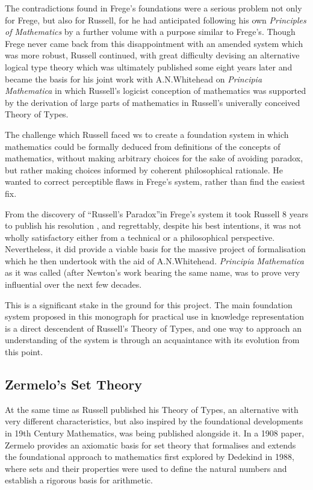 The contradictions found in Frege's foundations were a serious problem not only for Frege, but also for Russell, for he had anticipated following his own \emph{Principles of Mathematics}\cite{russell1903} by a further volume with a purpose similar to Frege's.
Though Frege never came back from this disappointment with an amended system which was more robust, Russell continued, with great difficulty devising an alternative logical type theory which was ultimately published some eight years later \cite{russell1908} and became the basis for his joint work with A.N.Whitehead on \emph{Principia Mathematica}\cite{whitehead1910} in which Russell's logicist conception of mathematics was supported by the derivation of large parts of mathematics in Russell's univerally conceived Theory of Types.

The challenge which Russell faced ws to create a foundation system in which mathematics could be formally deduced from definitions of the concepts of mathematics, without making arbitrary choices for the sake of avoiding paradox, but rather making choices informed by coherent philosophical rationale.
He wanted to correct perceptible flaws in Frege's system, rather than find the easiest fix.

From the discovery of ``Russell's Paradox''in Frege's system it took Russell 8 years to publish his resolution \cite{russell1908}, and regrettably, despite his best intentions, it was not wholly satisfactory either from a technical or a philosophical perspective.
Nevertheless, it did provide a viable basis for the massive project of formalisation which he then undertook with the aid of A.N.Whitehead.
\emph{Principia Mathematica} \cite{whitehead1910} as it was called (after Newton's work bearing the same name, was to prove very influential over the next few decades.

This is a significant stake in the ground for this project.
The main foundation system proposed in this monograph for practical use in knowledge representation is a direct descendent of Russell's Theory of Types, and one way to approach an understanding of the system is through an acquaintance with its evolution from this point.

\subsection{Zermelo's Set Theory}

At the same time as Russell published his Theory of Types, an alternative with very different characteristics, but also inspired by the foundational developments in 19th Century Mathematics, was being published alongside it.
In a 1908 paper, Zermelo\cite{zermelo1908} provides an axiomatic basis for set theory that formalises and extends the foundational approach to mathematics first explored by Dedekind in 1988\cite{dedekind1888}, where sets and their properties were used to define the natural numbers and establish a rigorous basis for arithmetic.

